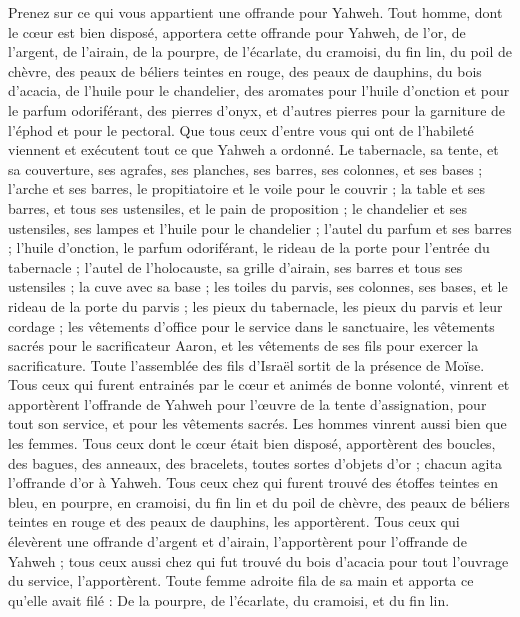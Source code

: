 \begin{multicols}{2}
Prenez sur ce qui vous appartient une offrande pour Yahweh. Tout homme, dont le cœur est bien disposé, apportera cette offrande pour Yahweh, de l'or, de l'argent, de l'airain,
de la pourpre, de l'écarlate, du cramoisi, du fin lin, du poil de chèvre,
des peaux de béliers teintes en rouge, des peaux de dauphins, du bois d’acacia,
de l'huile pour le chandelier, des aromates pour l'huile d'onction et pour le parfum odoriférant,
des pierres d'onyx, et d’autres pierres pour la garniture de l'éphod et pour le pectoral.
Que tous ceux d’entre vous qui ont de l’habileté viennent et exécutent tout ce que Yahweh a ordonné.
Le tabernacle, sa tente, et sa couverture, ses agrafes, ses planches, ses barres, ses colonnes, et ses bases ;
l'arche et ses barres, le propitiatoire et le voile pour le couvrir ;
la table et ses barres, et tous ses ustensiles, et le pain de proposition ;
le chandelier et ses ustensiles, ses lampes et l'huile pour le chandelier ;
l'autel du parfum et ses barres ; l'huile d'onction, le parfum odoriférant, le rideau de la porte pour l'entrée du tabernacle ;
l'autel de l'holocauste, sa grille d'airain, ses barres et tous ses ustensiles ; la cuve avec sa base ;
les toiles du parvis, ses colonnes, ses bases, et le rideau de la porte du parvis ;
les pieux du tabernacle, les pieux du parvis et leur cordage ;
les vêtements d’office pour le service dans le sanctuaire, les vêtements sacrés pour le sacrificateur Aaron, et les vêtements de ses fils pour exercer la sacrificature.
Toute l'assemblée des fils d'Israël sortit de la présence de Moïse.
Tous ceux qui furent entrainés par le cœur et animés de bonne volonté, vinrent et apportèrent l'offrande de Yahweh pour l’œuvre de la tente d'assignation, pour tout son service, et pour les vêtements sacrés.
Les hommes vinrent aussi bien que les femmes. Tous ceux dont le cœur était bien disposé, apportèrent des boucles, des bagues, des anneaux, des bracelets, toutes sortes d’objets d'or ; chacun agita l’offrande d'or à Yahweh.
Tous ceux chez qui furent trouvé des étoffes teintes en bleu, en pourpre, en cramoisi, du fin lin et du poil de chèvre, des peaux de béliers teintes en rouge et des peaux de dauphins, les apportèrent.
Tous ceux qui élevèrent une offrande d'argent et d'airain, l’apportèrent pour l'offrande de Yahweh ; tous ceux aussi chez qui fut trouvé du bois d’acacia pour tout l'ouvrage du service, l'apportèrent.
Toute femme adroite fila de sa main et apporta ce qu'elle avait filé : De la pourpre, de l'écarlate, du cramoisi, et du fin lin.

\end{multicols}
